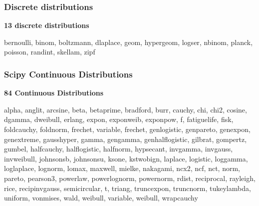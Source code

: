 \documentclass{beamer}
\begin{document}
\begin{frame}


\frametitle{Discrete distributions}

\textbf{13 discrete distributions}

bernoulli, 
binom, 
boltzmann, 
dlaplace, 
geom, 
hypergeom, 
logser, 
nbinom, 
planck, 
poisson, 
randint, 
skellam, 
zipf

\end{frame}

\begin{frame}


\frametitle{Scipy Continuous Distributions}

\textbf{84 Continuous Distributions}

alpha, 
anglit, 
arcsine, 
beta, 
betaprime, 
bradford, 
burr, 
cauchy, 
chi, 
chi2, 
cosine, 
dgamma, 
dweibull, 
erlang, 
expon, 
exponweib, 
exponpow, 
f, 
fatiguelife, 
fisk, 
foldcauchy, 
foldnorm, 
frechet, 
variable, 
frechet, 
genlogistic, 
genpareto, 
genexpon, 
genextreme, 
gausshyper, 
gamma, 
gengamma, 
genhalflogistic, 
gilbrat, 
gompertz, 
gumbel, 
halfcauchy, 
halflogistic, 
halfnorm, 
hypsecant, 
invgamma, 
invgauss, 
invweibull, 
johnsonsb, 
johnsonsu, 
ksone, 
kstwobign, 
laplace, 
logistic, 
loggamma, 
loglaplace, 
lognorm, 
lomax, 
maxwell, 
mielke, 
nakagami, 
ncx2, 
ncf, 
nct, 
norm, 
pareto, 
pearson3, 
powerlaw, 
powerlognorm, 
powernorm, 
rdist, 
reciprocal, 
rayleigh, 
rice, 
recipinvgauss, 
semicircular, 
t, 
triang, 
truncexpon, 
truncnorm, 
tukeylambda, 
uniform, 
vonmises, 
wald, 
weibull, 
variable, 
weibull, 
wrapcauchy


\end{frame}
\end{document}
